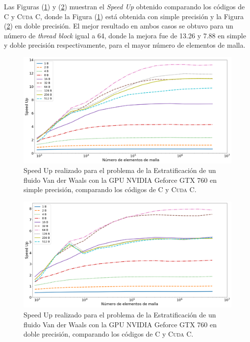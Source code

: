 Las Figuras (\ref{fig:s_760_VdW_simple_10}) y (\ref{fig:s_760_VdW_double_10}) muestran el \textit{Speed Up} obtenido comparando los códigos de \textsc{C} y \textsc{Cuda C}, donde la Figura (\ref{fig:s_760_VdW_simple_10}) está obtenida con simple precisión y la Figura (\ref{fig:s_760_VdW_double_10}) en doble precisión. El mejor resultado en ambos casos se obtuvo para un número de \textit{thread block} igual a 64, donde la mejora fue de 13.26 y 7.88 en simple y doble precisión respectivamente, para el mayor número de elementos de malla.


\begin{figure}[htbp]
	\centering
	\includegraphics[width=\textwidth]{figs/cap4/s_760_VdW_simple_10}
	\caption{Speed Up realizado para el problema de la Estratificación de un fluido Van der Waals con la GPU NVIDIA Geforce GTX 760 en simple precisión, comparando los códigos de \textsc{C} y \textsc{Cuda C}.} 
	\label{fig:s_760_VdW_simple_10}	
\end{figure}

\begin{figure}[htbp]
	\centering
	\includegraphics[width=\textwidth]{figs/cap4/s_760_VdW_double_10}
	\caption{Speed Up realizado para el problema de la Estratificación de un fluido Van der Waals con la GPU NVIDIA Geforce GTX 760 en doble precisión, comparando los códigos de \textsc{C} y \textsc{Cuda C}.} 
	\label{fig:s_760_VdW_double_10}	
\end{figure}

